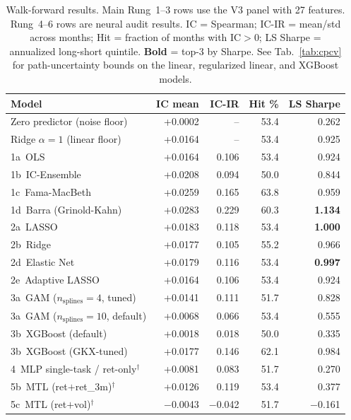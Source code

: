 \documentclass[11pt]{article}
\begin{document}
\begin{table}[t]
\centering
\caption{Walk-forward results. Main Rung~1--3 rows use the V3 panel with
27 features. Rung~4--6 rows are neural audit results. IC = Spearman;
IC-IR = mean/std across months; Hit = fraction of months with IC$>$0;
LS Sharpe = annualized long-short quintile. \textbf{Bold} = top-3 by
Sharpe. See Tab.~\ref{tab:cpcv} for path-uncertainty bounds on the
linear, regularized linear, and XGBoost models.}
\label{tab:wf-results}
\small
\begin{tabular}{l r r r r}
\toprule
Model & IC mean & IC-IR & Hit \% & LS Sharpe \\
\midrule
Zero predictor (noise floor)       & +0.0002 & --      & 53.4 & 0.262 \\
Ridge $\alpha{=}1$ (linear floor)  & +0.0164 & --      & 53.4 & 0.925 \\
\midrule
1a~OLS                            & +0.0164 & 0.106 & 53.4 & 0.924 \\
1b~IC-Ensemble                    & +0.0208 & 0.094 & 50.0 & 0.844 \\
1c~Fama-MacBeth                   & +0.0259 & 0.165 & 63.8 & 0.959 \\
1d~Barra (Grinold-Kahn)           & +0.0283 & 0.229 & 60.3 & \textbf{1.134} \\
\midrule
2a~LASSO                          & +0.0183 & 0.118 & 53.4 & \textbf{1.000} \\
2b~Ridge                          & +0.0177 & 0.105 & 55.2 & 0.966 \\
2d~Elastic Net                    & +0.0179 & 0.116 & 53.4 & \textbf{0.997} \\
2e~Adaptive LASSO                 & +0.0164 & 0.106 & 53.4 & 0.924 \\
\midrule
3a~GAM ($n_{\text{splines}}{=}4$, tuned)  & +0.0141 & 0.111 & 51.7 & 0.828 \\
3a~GAM ($n_{\text{splines}}{=}10$, default) & +0.0068 & 0.066 & 53.4 & 0.555 \\
3b~XGBoost (default)              & +0.0018 & 0.018 & 50.0 & 0.335 \\
3b~XGBoost (GKX-tuned)            & +0.0177 & 0.146 & 62.1 & 0.984 \\
\midrule
4~MLP single-task / ret-only$^{\dagger}$     & +0.0081 & 0.083 & 51.7 & 0.270 \\
\midrule
5b~MTL (ret$+$ret\_3m)$^{\dagger}$           & +0.0126 & 0.119 & 53.4 & 0.377 \\
5c~MTL (ret$+$vol)$^{\dagger}$               & $-$0.0043 & $-$0.042 & 51.7 & $-$0.161 \\

\end{tabular}
\end{table}
\end{document}
